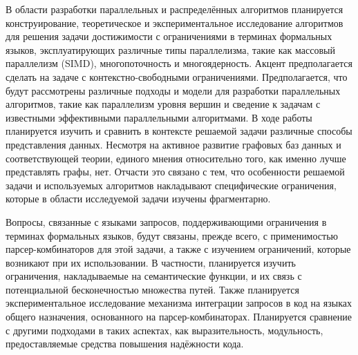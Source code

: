 \documentclass[12pt]{article}  %
\theoremstyle{remark}
\begin{document}
В области разработки параллельных и распределённых алгоритмов планируется конструирование, теоретическое и экспериментальное исследование алгоритмов для решения задачи достижимости с ограничениями в терминах формальных языков, эксплуатирующих различные типы параллелизма, такие как массовый параллелизм (SIMD), многопоточность и многоядерность. Акцент предполагается сделать на задаче с контекстно-свободными ограничениями. Предполагается, что будут рассмотрены различные подходы и модели для разработки параллельных алгоритмов, такие как параллелизм уровня вершин и сведение к задачам с известными эффективными параллельными алгоритмами. В ходе работы планируется изучить и сравнить в контексте решаемой задачи различные способы представления данных. Несмотря на активное развитие графовых баз данных и соответствующей теории, единого мнения относительно того, как именно лучше представлять графы, нет. Отчасти это связано с тем, что особенности решаемой задачи и используемых алгоритмов накладывают специфические ограничения, которые в области исследуемой задачи изучены фрагментарно.

Вопросы, связанные с языками запросов, поддерживающими ограничения в терминах формальных языков, будут связаны, прежде всего, с применимостью парсер-комбинаторов для этой задачи, а также с изучением ограничений, которые возникают при их использовании.
В частности, планируется изучить ограничения, накладываемые на семантические функции, и их связь с потенциальной бесконечностью множества путей.
Также планируется экспериментальное исследование механизма интеграции запросов в код на языках общего назначения, основанного на парсер-комбинаторах. Планируется сравнение с другими подходами в таких аспектах, как выразительность, модульность, предоставляемые средства повышения надёжности кода.
\end{document}
